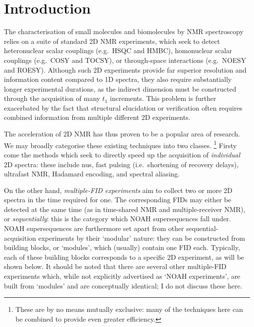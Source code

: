 \section{Introduction}
\label{sec:noah__introduction}

The characterisation of small molecules and biomolecules by NMR spectroscopy relies on a suite of standard 2D NMR experiments, which seek to detect heteronuclear scalar couplings (e.g.\ HSQC and HMBC), homonuclear scalar couplings (e.g.\ COSY and TOCSY), or through-space interactions (e.g.\ NOESY and ROESY).
Although such 2D experiments provide far superior resolution and information content compared to 1D spectra, they also require substantially longer experimental durations, as the indirect dimension must be constructed through the acquisition of many $t_1$ increments.
This problem is further exacerbated by the fact that structural elucidation or verification often requires combined information from multiple different 2D experiments.

The acceleration of 2D NMR has thus proven to be a popular area of research.
We may broadly categorise these existing techniques into two classes.%
\footnote{These are by no means mutually exclusive: many of the techniques here can be combined to provide even greater efficiency.}
Firsty come the methods which seek to directly speed up the acquisition of \textit{individual} 2D spectra: these include
\acf{nus}\autocite{Barna1987JMR,Kazimierczuk2010PNMRS,Mobli2014PNMRS,Kazimierczuk2015MRC},
fast pulsing (i.e.\ shortening of recovery delays)\autocite{SchulzeSunninghausen2014JACS,Schanda2006JACS,Kupce2007MRC,Schanda2009PNMRS},
ultrafast NMR\autocite{Frydman2002PNASUSA,Pelupessy2003JACS,Frydman2003JACS,Tal2010PNMRS,Gouilleux2018ARNMRS,Kupce2021NRMP},
Hadamard encoding\autocite{Kupce2003JMR,Kupce2003PNMRS},
and spectral aliasing\autocite{Jeannerat2000MRC,Bermel2009JACS,Njock2010C,Jeannerat2011eMR}.

On the other hand, \textit{multiple-FID experiments} aim to collect two or more 2D spectra in the time required for one.
The corresponding FIDs may either be detected at the same time (as in
time-shared NMR\autocite{Nolis2007ACIE,Parella2010CMR,Nolis2019JMR_psHSQC} and
multiple-receiver NMR\autocite{Kupce2006JACS,Kupce2008JACS,Kovacs2016MRC}),
or \textit{sequentially}: this is the category which NOAH supersequences\autocite{Kupce2017ACIE,Kupce2021PNMRS,Kupce2021NRMP} fall under.
NOAH supersequences are furthermore set apart from other sequential-acquisition experiments\autocite{Haasnoot1984JMR,Gurevich1984JMR,MotiramCorral2018CC,Nolis2019MRC,Nolis2019CPC,Nolis2019JMR} by their `modular' nature: they can be constructed from building blocks, or `modules', which (usually) contain one FID each.
Typically, each of these building blocks corresponds to a specific 2D experiment, as will be shown below.
It should be noted that there are several other multiple-FID experiments which, while not explicitly advertised as `NOAH experiments', are built from `modules' and are conceptually identical\autocite{Nagy2019CC,Nagy2020JMR,Nagy2021ACIE,Timari2022CC}; I do not discuss these here.

